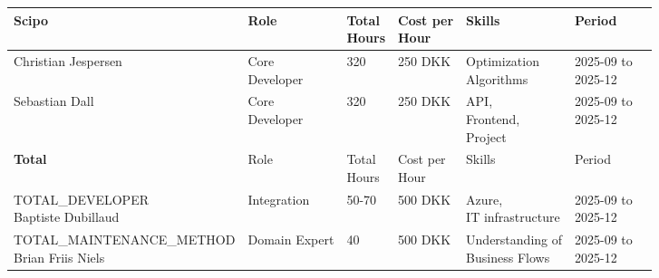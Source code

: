 \documentclass{article}
\begin{document}
\begin{table}[H]

\centering
\begin{tabular}{lllllll}
    \toprule
    \textbf{Scipo}                                                          & Role                            & \makecell[lt]{Total\\Hours} & \makecell[lt]{Cost per\\Hour}        & Skills                                                                  & Period                             &  \\
    \midrule
    Christian Jespersen                                                     & \makecell[lt]{Core\\Developer}  & 320                         & 250 DKK                              & \makecell[lt]{Optimization\\Algorithms}                                 & \makecell[lt]{2025-09 to\\2025-12} &  \\
    Sebastian Dall                                                          & \makecell[lt]{Core\\Developer}  & 320                         & 250 DKK                              & \makecell[lt]{API,\\Frontend,\\Project}                                 & \makecell[lt]{2025-09 to\\2025-12} &  \\
    \toprule
    \textbf{Total}                                                          & Role                            & \makecell[lt]{Total\\Hours} & \makecell[lt]{Cost per\\Hour}        & Skills                                                                  & Period                             &  \\
    \midrule
    \makecell[tl]{TOTAL\_DEVELOPER\\Baptiste Dubillaud}                     & Integration                     & 50-70                       & 500 DKK                              & \makecell[lt]{Azure,\\IT infrastructure}                                & \makecell[lt]{2025-09 to\\2025-12} &  \\
    \makecell[tl]{TOTAL\_MAINTENANCE\_METHOD\\Brian Friis Niels}            & Domain Expert                   & 40                          & 500 DKK                              & \makecell[lt]{Understanding of\\Business Flows}                            & \makecell[lt]{2025-09 to\\2025-12} &  \\

\end{tabular}
\end{table}
\end{document}
